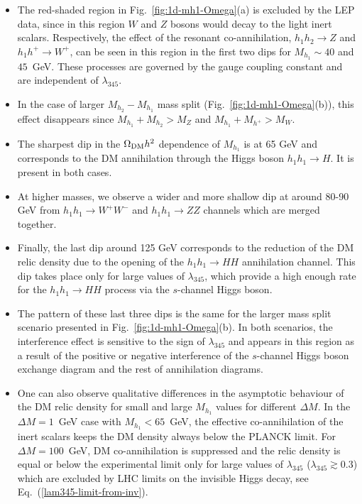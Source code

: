 \documentclass[12pt,a4paper]{article}
\begin{document}
\begin{itemize}
\item The red-shaded region in Fig.~\ref{fig:1d-mh1-Omega}(a) 
is excluded by the LEP data, since in this region $W$ and $Z$ bosons would decay to the light inert scalars. 
Respectively, the effect of the resonant co-annihilation, $h_1 h_2 \to Z$ and $h_1 h^+ \to W^+$, can be seen 
in this region in the first two dips for $M_{h_1} \sim 40$ and $45$~GeV.
These processes are governed by the gauge coupling constant and are independent of $\lambda_{345}$. 
\item
In the case of larger $M_{h_2}-M_{h_1}$  mass split (Fig.~\ref{fig:1d-mh1-Omega}(b)), 
this effect disappears since $M_{h_1}+M_{h_2} > M_Z$ and $M_{h_1}+M_{h^+} > M_W$.
\item
The sharpest dip in the $\Omega_{\rm DM} h^2$ dependence of $M_{h_1}$ is at 65 GeV and 
corresponds to the DM annihilation through the Higgs boson $h_1 h_1 \to H$. It is present in both cases. 
\item
At higher masses, we observe a wider and more shallow  dip at around 80-90 GeV from  $h_1
h_1\to W^+W^-$ and $h_1 h_1\to ZZ$ channels which are merged together. 
\item
Finally, the last dip around 125 GeV corresponds to the
reduction of the DM relic density  due to the opening of the $ h_1 h_1\to HH$ annihilation channel. This dip takes place only for 
large values of $\lambda_{345}$, which provide a high enough rate for the $h_1h_1\to HH$ process via the $s$-channel Higgs boson. 
\item
The pattern of these last three dips is the same for the larger mass split scenario presented in Fig.~\ref{fig:1d-mh1-Omega}(b). 
In both scenarios, the interference effect is sensitive to the sign of $\lambda_{345}$ and appears in this region 
as a result of the positive or negative interference of the $s$-channel Higgs boson exchange
diagram and the rest of annihilation diagrams.
\item
One can also observe qualitative differences in the asymptotic behaviour of the DM relic density for small
and large $M_{h_1}$ values for different $\Delta M$. In the $\Delta M=1$~GeV case with $M_{h_1} < 65$~GeV, the effective
co-annihilation of the inert scalars keeps the DM density always below the PLANCK limit. 
For $\Delta M=100 $~GeV, DM co-annihilation is suppressed and the relic density  is equal or below the experimental
limit only for large values of $\lambda_{345}$ ($\lambda_{345} \gtrsim 0.3$) which are excluded by LHC
limits on the invisible Higgs decay, see Eq.~(\ref{lam345-limit-from-inv}).

\end{itemize}
\end{document}
